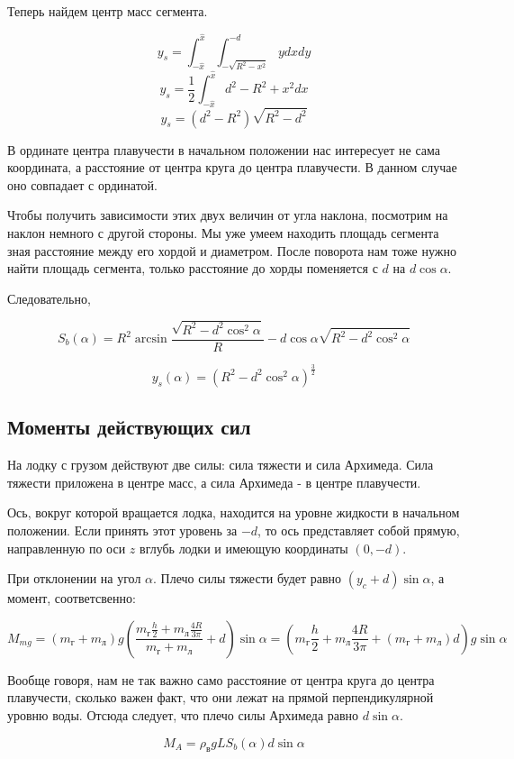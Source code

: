 \documentclass[12pt,a4paper]{article}
\begin{document}
Теперь найдем центр масс сегмента.

$$ y_s = \int_{-\hat{x}}^{\hat{x}} \int_{-\sqrt{R^2-x^2}}^{-d} y dx dy $$
$$ y_s = \frac{1}{2} \int_{-\hat{x}}^{\hat{x}} d^2 - R^2 + x^2 dx $$
$$ y_s = (d^2 - R^2)\sqrt{R^2-d^2}  $$

В ординате центра плавучести в начальном положении нас интересует не сама координата, а расстояние от центра круга до центра плавучести. В данном случае оно совпадает с ординатой.

Чтобы получить зависимости этих двух величин от угла наклона, посмотрим на наклон немного с другой стороны. Мы уже умеем находить площадь сегмента зная расстояние между его хордой и диаметром. После поворота нам тоже нужно найти площадь сегмента, только расстояние до хорды поменяется с $d$ на $d\cos\alpha$. 

Следовательно, 

$$ S_b(\alpha) = R^2 \arcsin\frac{\sqrt{R^2-d^2\cos^2\alpha}}{R} - d\cos\alpha\sqrt{R^2-d^2\cos^2\alpha} $$

$$ y_s(\alpha) = (R^2-d^2\cos^2\alpha)^{\frac{3}{2}} $$


\subsection{Моменты действующих сил}

На лодку с грузом действуют две силы: сила тяжести и сила Архимеда. Сила тяжести приложена в центре масс, а сила Архимеда - в центре плавучести. 

Ось, вокруг которой вращается лодка, находится на уровне жидкости в начальном положении. Если принять этот уровень за $-d$, то ось представляет собой прямую, направленную по оси $z$ вглубь лодки и имеющую координаты $(0, -d)$.

При отклонении на угол $\alpha$. Плечо силы тяжести будет равно $(y_c+d)\sin\alpha$, а момент, соответсвенно:

$$ M_{mg} = (m_\text{г} + m_\text{л})g (\frac{m_\text{г}\frac{h}{2} + m_\text{л}\frac{4R}{3\pi}}{m_\text{г} + m_\text{л}} + d) \sin\alpha = (m_\text{г}\frac{h}{2} + m_\text{л}\frac{4R}{3\pi} + (m_\text{г} + m_\text{л})d)g\sin\alpha $$

Вообще говоря, нам не так важно само расстояние от центра круга до центра плавучести, сколько важен факт, что они лежат на прямой перпендикулярной уровню воды. Отсюда следует, что плечо силы Архимеда равно $d\sin\alpha$.

$$ M_A = \rho_\text{в}gLS_b(\alpha)d\sin\alpha $$
\end{document}
